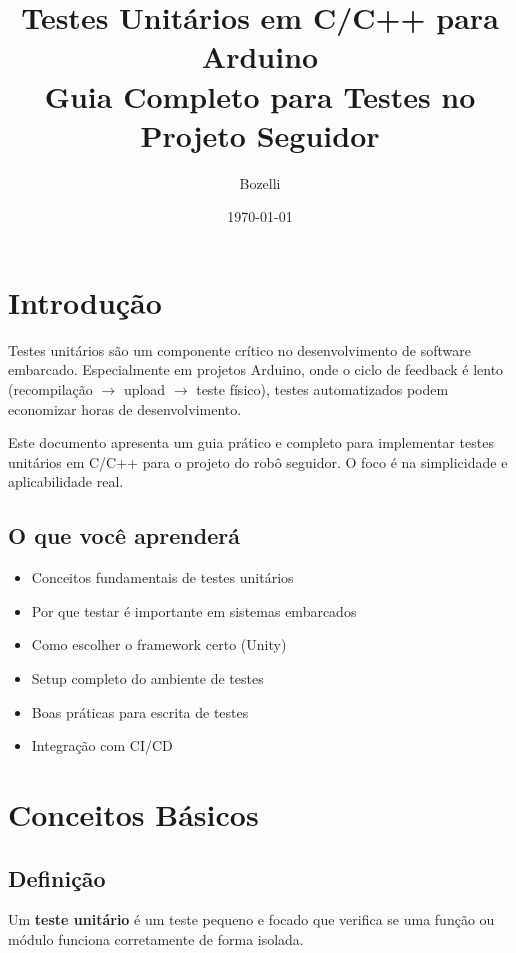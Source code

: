 \documentclass[12pt,a4paper]{article}
\title{
    \Huge \textbf{Testes Unitários em C/C++ para Arduino} \\
    \large Guia Completo para Testes no Projeto Seguidor
}
\author{Bozelli}
\date{\today}
\begin{document}
\maketitle

\tableofcontents
\newpage

\section{Introdução}

Testes unitários são um componente crítico no desenvolvimento de software embarcado.
Especialmente em projetos Arduino, onde o ciclo de feedback é lento (recompilação $\rightarrow$ upload $\rightarrow$ teste físico),
testes automatizados podem economizar horas de desenvolvimento.

Este documento apresenta um guia prático e completo para implementar testes unitários 
em C/C++ para o projeto do robô seguidor. O foco é na simplicidade e aplicabilidade real.

\subsection{O que você aprenderá}

\begin{itemize}
    \item Conceitos fundamentais de testes unitários
    \item Por que testar é importante em sistemas embarcados
    \item Como escolher o framework certo (Unity)
    \item Setup completo do ambiente de testes
    \item Boas práticas para escrita de testes
    \item Integração com CI/CD
\end{itemize}

\section{Conceitos Básicos}

\subsection{Definição}

Um \textbf{teste unitário} é um teste pequeno e focado que verifica se uma função ou módulo 
funciona corretamente de forma isolada.
\end{document}
